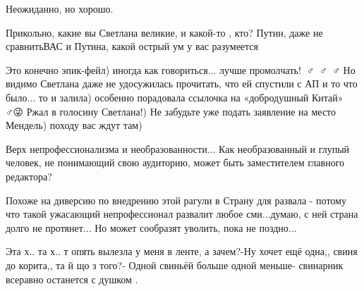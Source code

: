 \begin{itemize}
 
Неожиданно, но хорошо.

 
Прикольно, какие вы Светлана великие, и какой-то , кто? Путин, даже не сравнитьВАС и Путина, какой острый ум у вас разумеется

 

Это конечно эпик-фейл) иногда как говориться... лучше
промолчать!🤦🏼♂️🤦🏼♂️🤦🏼♂️ Но видимо Светлана даже не
удосужилась прочитать, что ей спустили с АП и то что было... то и залила)
особенно порадовала ссылочка на «добродушный Китай»🥰😂😂😂🤦🏼♂️😜 Ржал в
голосину Светлана!) Не забудьте уже подать заявление на место Мендель) походу
вас ждут там)

 

Верх непрофессионализма и необразованности... Как необразованный и глупый
человек, не понимающий свою аудиторию, может быть заместителем главного
редактора?

Похоже на диверсию по внедрению этой рагули в Страну для развала - потому что
такой ужасающий непрофессионал развалит любое сми...думаю, с ней страна долго не
протянет... Но может сообразят уволить, пока не поздно...


 

Эта х.. та х.. т опять вылезла у меня в ленте, а зачем?-Ну хочет ещё одна,,
свиня до корита,, та й що з того?- Одной свиньёй больше одной меньше- свинарник
всеравно останется с душком .


\end{itemize}
